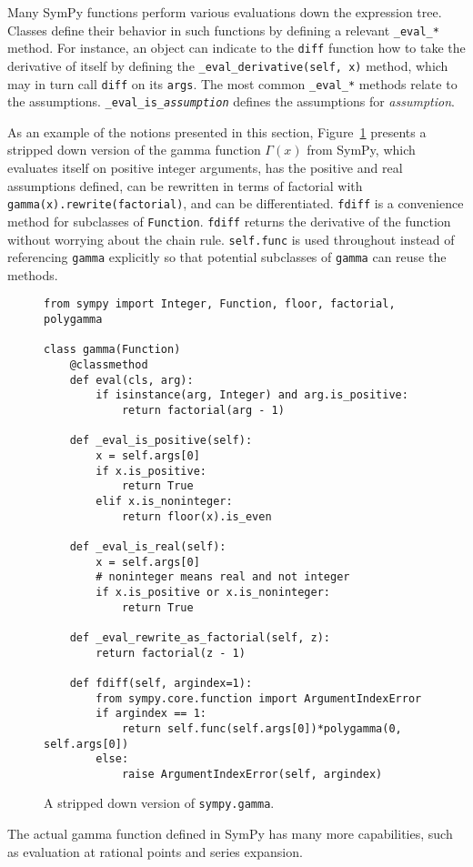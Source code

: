 Many SymPy functions perform various evaluations down the expression tree.
Classes define their behavior in such functions by defining a relevant
\verb|_eval_|\texttt{\textit{*}} method. For instance, an object can indicate
to the \texttt{diff} function how to take the derivative of itself by defining
the \verb|_eval_derivative(self, x)| method, which may in turn call
\texttt{diff} on its \texttt{args}. The most common
\verb|_eval_|\texttt{\textit{*}} methods relate to the assumptions.
\verb|_eval_is_|\texttt{\textit{assumption}} defines the assumptions for
\textit{assumption}.

As an example of the notions presented in this section,
Figure~\ref{fig:gamma-example} presents a stripped down version of the gamma
function $\Gamma(x)$ from SymPy, which evaluates itself on positive integer
arguments, has the positive and real assumptions defined, can be rewritten in
terms of factorial with \verb|gamma(x).rewrite(factorial)|, and can be
differentiated. \texttt{fdiff} is a convenience method for subclasses of
\texttt{Function}. \texttt{fdiff} returns the derivative of the function
without worrying about the chain rule. \texttt{self.func} is used throughout
instead of referencing \texttt{gamma} explicitly so that potential subclasses
of \texttt{gamma} can reuse the methods.
\begin{figure}
\caption{A stripped down version of \texttt{sympy.gamma}.}
\label{fig:gamma-example}
\begin{verbatim}
from sympy import Integer, Function, floor, factorial, polygamma

class gamma(Function)
    @classmethod
    def eval(cls, arg):
        if isinstance(arg, Integer) and arg.is_positive:
            return factorial(arg - 1)

    def _eval_is_positive(self):
        x = self.args[0]
        if x.is_positive:
            return True
        elif x.is_noninteger:
            return floor(x).is_even

    def _eval_is_real(self):
        x = self.args[0]
        # noninteger means real and not integer
        if x.is_positive or x.is_noninteger:
            return True

    def _eval_rewrite_as_factorial(self, z):
        return factorial(z - 1)

    def fdiff(self, argindex=1):
        from sympy.core.function import ArgumentIndexError
        if argindex == 1:
            return self.func(self.args[0])*polygamma(0, self.args[0])
        else:
            raise ArgumentIndexError(self, argindex)
\end{verbatim}
\end{figure}
The actual gamma function defined in SymPy has many more capabilities, such as
evaluation at rational points and series expansion.
